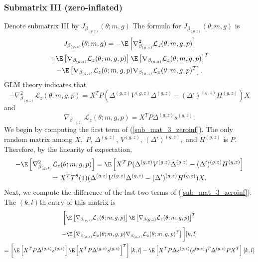 \documentclass[12pt]{article}
\begin{document}
\begin{appendices}
\subsubsection*{Submatrix III (zero-inflated)}
Denote submatrix III by $J_{\beta_{(g,z)}}(\theta; m, g)$ The formula for $J_{\beta_{(g,z)}}(\theta; m, g)$ is
\begin{multline}\label{sub_mat_3_zeroinf}
J_{\beta_{(g,z)}}(\theta; m, g) = -\E \left[\nabla_{\beta_{(g,z)}}^2 \mathcal{L}_z(\theta; m, g, p) \right] \\ + \E\left[ \nabla_{\beta_{(g,z)}} \mathcal{L}_z(\theta; m, g, p) \right] \E\left[\nabla_{\beta_{(g,z)}} \mathcal{L}_z(\theta; m, g, p) \right]^T \\ - \E\left[ \nabla_{\beta_{(g,z)}} \mathcal{L}_z(\theta; m, g, p) \nabla_{\beta_{(g,z)}} \mathcal{L}_z(\theta; m, g, p)^T \right].
\end{multline}
GLM theory indicates that
$$ -\nabla_{\beta_{(g,z)}}^2 \mathcal{L}_z(\theta; m, g, p) =  X^T P ( \Delta^{(g,z)}V^{(g,z)}\Delta^{(g,z)} - (\Delta')^{(g,z)} H^{(g,z)}) X$$ and
$$ \nabla_{\beta_{(g,z)}} \mathcal{L}_z(\theta; m, g, p) = X^T P \Delta^{(g,z)} s^{(g,z)}.$$
We begin by computing the first term of (\ref{sub_mat_3_zeroinf}). The only random matrix among $X,$ $P$, $\Delta^{(g,z)}$, $V^{(g,z)}$, $(\Delta')^{(g,z)},$ and $H^{(g,z)}$ is $P$. Therefore, by the linearity of expectation,
\begin{multline}\label{sub_mat_3_zeroinf_1}
-\E \left[\nabla_{\beta_{(g,z)}}^2 \mathcal{L}_z(\theta; m, g, p) \right]   = \E \left[ X^T P (\Delta^{(g,z)}V^{(g,z)}\Delta^{(g,z)} - (\Delta')^{(g,z)} H^{(g,z)} \right] \\ = X^T T^{\theta}(1) ( \Delta^{(g,z)}V^{(g,z)}\Delta^{(g,z)} - (\Delta')^{(g,z)} H^{(g,z)}) X.
\end{multline}
Next, we compute the difference of the last two terms of (\ref{sub_mat_3_zeroinf}). The $(k,l)$th entry of this matrix is
\begin{multline*}
\bigg[ \E \left[\nabla_{\beta_{(g,z)}} \mathcal{L}_z(\theta; m, g, p) \right] \E \left[\nabla_{\beta{(g,z)}} \mathcal{L}_z(\theta; m, g, p)\right]^T \\ - \E \left[ \nabla_{{\beta_{(g,z)}}} \mathcal{L}_z(\theta; m, g, p) \nabla_{{\beta_{(g,z)}}} \mathcal{L}_z(\theta; m, g, p)^T \right] \bigg] [k,l] \\ 
= \left[ \E \left[ {X}^T P \Delta^{(g,z)} s^{(g,z)} \right]\E \left[ {X}^T P \Delta^{(g,z)} s^{(g,z)} \right]^T\right][k,l] - \E \left[ {X}^T P \Delta s^{(g,z)} (s^{(g,z)})^T \Delta^{(g,z)} P {X}^T \right][k,l] \\ 

\end{multline*}
\end{appendices}
\end{document}
